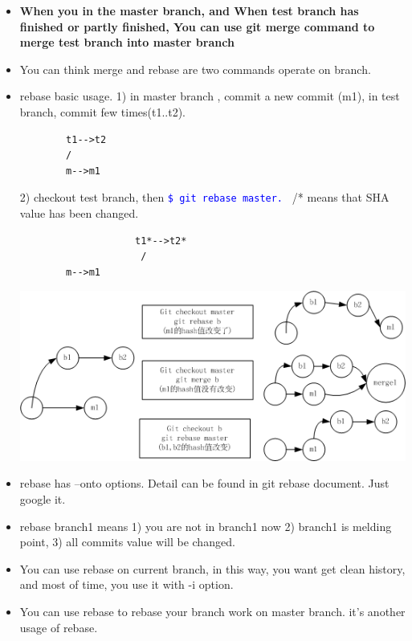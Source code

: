 \documentclass[a4paper,11pt,twoside]{book}
\newcommand{\linuxcommand}[1]{\texttt{\textcolor{blue}{\$ #1 \Pisymbol{psy}{191}}}}
\begin{document}
\begin{itemize}
	\item \textbf{When you in the master branch, and When test branch has finished or partly finished, You can use git merge command to merge test branch into master branch}
	
	\item You can think merge and rebase are two commands operate on branch.
	
	\item rebase basic usage.
	1) in master  branch , commit a new commit (m1), in test branch, commit few times(t1..t2). \\
	\begin{verbatim}
		t1-->t2
		/
		m-->m1
	\end{verbatim}
	2) checkout test branch, then \linuxcommand{git rebase master.} /* means that SHA value has been changed.\\
	\begin{verbatim}
              		t1*-->t2*
		             /
		m-->m1
	\end{verbatim}
	
	\includegraphics[scale=0.7]{pics/Git_rebase} \\
	
	\item rebase has --onto options. Detail can be found in git rebase document. Just google it. 
	
	\item rebase branch1 means 1) you are not in branch1 now 2) branch1 is melding point, 3) all commits value will be changed. 
	
	\item You can use rebase on current branch, in this way, you want get clean history, and most of time, you use it with -i option. 
	\item You can use rebase to rebase your branch work on master branch. it's another usage of rebase. 
	
\end{itemize}
\end{document}

